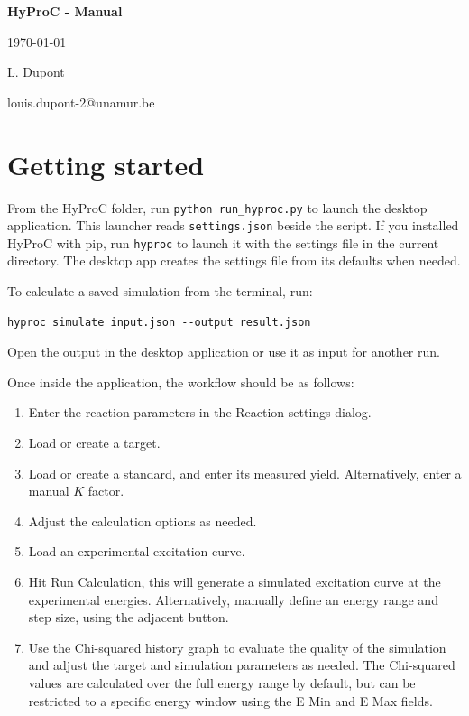 \documentclass[11pt,a4paper]{article}
\begin{document}
\begin{center}
    \LARGE
    \textbf{HyProC - Manual}

    \Large
    \today

    \vspace{0.25cm}
    L. Dupont

    \small
    louis.dupont-2@unamur.be
    
\end{center}

{\setlength{\parskip}{0pt} \tableofcontents}

\setlength{\parskip}{1em}   %

\newpage
\section{Getting started}
From the HyProC folder, run \texttt{python run\_hyproc.py} to launch the
desktop application. This launcher reads \texttt{settings.json} beside the
script. If you installed HyProC with pip, run \texttt{hyproc} to launch it
with the settings file in the current directory. The desktop app creates the
settings file from its defaults when needed.

To calculate a saved simulation from the terminal, run:
\begin{verbatim}
hyproc simulate input.json --output result.json
\end{verbatim}
Open the output in the desktop application or use it as input for another run.

Once inside the application, the workflow should be as follows:
\begin{enumerate}
    \item Enter the reaction parameters in the Reaction settings dialog.
    \item Load or create a target.
    \item Load or create a standard, and enter its measured yield. Alternatively, enter a manual $K$ factor.
    \item Adjust the calculation options as needed.
    \item Load an experimental excitation curve.
    \item Hit Run Calculation, this will generate a simulated excitation curve at the experimental energies. Alternatively, manually define an energy range and step size, using the adjacent button.
    \item Use the Chi-squared history graph to evaluate the quality of the simulation and adjust the target and simulation parameters as needed. The Chi-squared values are calculated over the full energy range by default, but can be restricted to a specific energy window using the E Min and E Max fields.
\end{enumerate}
\end{document}
